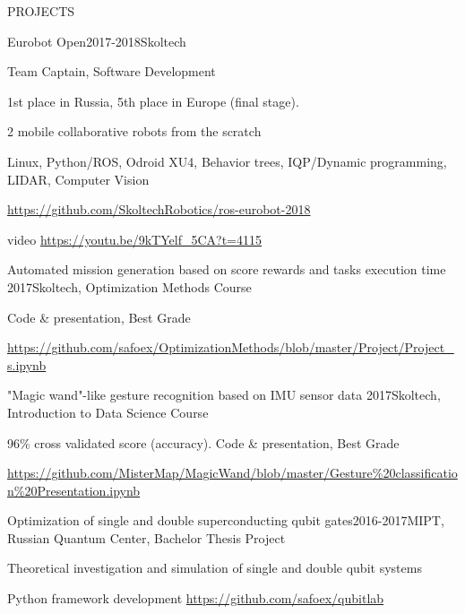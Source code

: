 \documentclass{resume} %
\begin{document}
\begin{rSection}{PROJECTS}
\begin{rSubsection}{Eurobot Open}{2017-2018}{Skoltech}{}
\item Team Captain, Software Development
\item 1st place in Russia, 5th place in Europe (final stage).
\item 2 mobile collaborative robots from the scratch
\item Linux, Python/ROS, Odroid XU4, Behavior trees, IQP/Dynamic programming, LIDAR, Computer Vision
\item \url{https://github.com/SkoltechRobotics/ros-eurobot-2018}
\item video \url{https://youtu.be/9kTYelf_5CA?t=4115}
\end{rSubsection}

\begin{rSubsection}{Automated mission generation based on score rewards and tasks execution time
}{2017}{Skoltech, Optimization Methods Course}{}
\item Code \& presentation, Best Grade
\item \url{https://github.com/safoex/OptimizationMethods/blob/master/Project/Project\_s.ipynb}
\end{rSubsection}

\begin{rSubsection}{"Magic wand"-like gesture recognition based on IMU sensor data }{2017}{Skoltech, Introduction to Data Science Course}{}
\item 96\% cross validated score (accuracy). Code \& presentation, Best Grade
\item \url{https://github.com/MisterMap/MagicWand/blob/master/Gesture\%20classification\%20Presentation.ipynb}
\end{rSubsection}

\begin{rSubsection}{Optimization of single and double superconducting qubit gates}{2016-2017}{MIPT, Russian Quantum Center, Bachelor Thesis Project}{}
\item Theoretical investigation and simulation of single and double qubit systems
\item Python framework development \url{https://github.com/safoex/qubitlab}
\end{rSubsection}



\end{rSection} 


\iffalse
\end{document}
